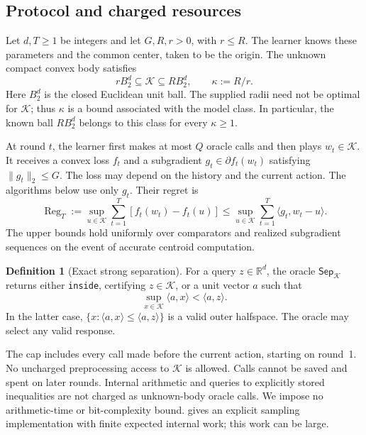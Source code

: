 \documentclass[11pt]{article}
\newcommand{\R}{\mathbb R}
\newcommand{\K}{\mathcal K}
\newcommand{\Reg}{\operatorname{Reg}}
\newcommand{\Sep}{\mathsf{Sep}}
\newcommand{\ip}[2]{\langle #1,#2\rangle}
\newcommand{\norm}[1]{\lVert #1\rVert}
\theoremstyle{definition}
\newtheorem{definition}[definition]{Definition}
\newcounter{algorithm}
\begin{document}
\subsection{Protocol and charged resources}

Let $d,T\ge1$ be integers and let $G,R,r>0$, with $r\le R$.
The learner knows these parameters and the common center, taken to be the
origin. The unknown compact convex body satisfies
\begin{equation}\label{eq:sandwich}
 rB_2^d\subseteq\K\subseteq RB_2^d,
 \qquad \kappa:=R/r.
\end{equation}
Here $B_2^d$ is the closed Euclidean unit ball. The supplied radii need not be
optimal for $\K$; thus $\kappa$ is a bound associated with the model class.
In particular, the known ball $RB_2^d$ belongs to this class for every
$\kappa\ge1$.

At round $t$, the learner first makes at most $Q$ oracle calls and then plays
$w_t\in\K$. It receives a convex loss $f_t$ and a subgradient
$g_t\in\partial f_t(w_t)$ satisfying $\norm{g_t}_2\le G$.
The loss may depend on the history and the current action. The algorithms
below use only $g_t$. Their regret is
\begin{equation}\label{eq:regret}
 \Reg_T:=\sup_{u\in\K}\sum_{t=1}^T[f_t(w_t)-f_t(u)]
 \le \sup_{u\in\K}\sum_{t=1}^T\ip{g_t}{w_t-u}.
\end{equation}
The upper bounds hold uniformly over comparators and realized subgradient
sequences on the event of accurate centroid computation.

\begin{definition}[Exact strong separation]\label{def:sep}
For a query $z\in\R^d$, the oracle $\Sep_\K$ returns either
\texttt{inside}, certifying $z\in\K$, or a unit vector $a$ such that
\[
 \sup_{x\in\K}\ip{a}{x}<\ip{a}{z}.
\]
In the latter case, $\{x:\ip{a}{x}\le\ip{a}{z}\}$ is a valid outer halfspace.
The oracle may select any valid response.
\end{definition}

The cap includes every call made before the current action, starting on
round~1. No uncharged preprocessing access to $\K$ is allowed. Calls cannot
be saved and spent on later rounds. Internal arithmetic and queries to
explicitly stored inequalities are not charged as unknown-body oracle calls.
We impose no arithmetic-time or bit-complexity bound. 
gives an explicit sampling implementation with finite expected internal work;
this work can be large.
\end{document}
